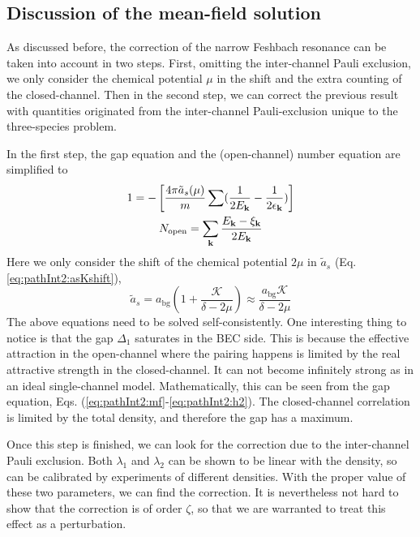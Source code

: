 \documentclass[reprint,pra]{revtex4-1}
\begin{document}
\subsection{Discussion of the mean-field solution\label{sec:pathInt2:mean2}}
As discussed before, the correction of the narrow Feshbach resonance can be taken into account in two steps.  First,  omitting the inter-channel Pauli exclusion, we only consider the chemical potential $\mu$ in the shift and  the extra counting of the closed-channel.  Then in the second step, we can correct the previous result with quantities originated from the inter-channel Pauli-exclusion unique to the three-species problem. 

In  the first step, the gap equation and the (open-channel) number equation are simplified to 
\begin{gather}
1=-\left[\frac{4\pi{\tilde{a}_{s}(\mu)}}{m}\sum(\frac{1}{2E_{\mathbf{k}}}-\frac{1}{2\epsilon_{\mathbf{k}}})\right]\label{eq:pathInt2:narrowGapS}\\
N_{\text{open}}=\sum_{\mathbf{k}}\frac{E_{\mathbf{k}}-\xi_{\mathbf{k}}}{2E_{\mathbf{k}}}\label{eq:pathInt2:narrowNumS}
\end{gather}
Here we only consider the shift of the  chemical potential $2\mu$ in   $\tilde{a}_s$ (Eq. \ref{eq:pathInt2:asKshift}),
\begin{equation}
\tilde{a}_{s}=a_{\text{bg}}(1+\frac{\mathcal{K}}{\delta-2\mu})\approx{}\frac{a_{\text{bg}}\mathcal{K}}{\delta-2\mu}
\label{eq:pathInt2:simplenarrowAs}
\end{equation}
The above equations need to be solved self-consistently.  One interesting thing  to notice is that the gap $\Delta_1$ saturates in the BEC side. This is because the effective attraction in the open-channel where the pairing happens is limited by the real attractive strength in the closed-channel.  It can not become  infinitely strong as in an ideal single-channel model.  Mathematically, this can be seen from the gap equation, Eqs. (\ref{eq:pathInt2:mf}-\ref{eq:pathInt2:h2}). The closed-channel correlation is limited by the total density, and therefore the gap has a maximum.  

Once this step is finished, we can look for the correction due to the inter-channel Pauli exclusion.  Both $\lambda_1$ and $\lambda_2$ can be shown  to be linear with the density, so can be calibrated by experiments of different densities.  With the proper value of these two parameters, we can find the correction.  It is nevertheless not hard to show that the correction is of order $\zeta$, so that we are warranted to  treat this effect as a perturbation. 
\end{document}
